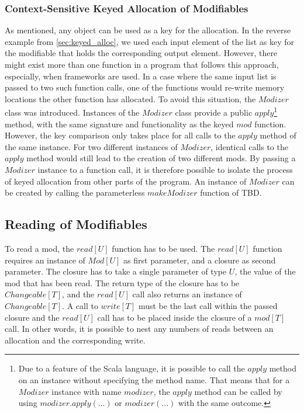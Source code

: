\subsubsection{Context-Sensitive Keyed Allocation of Modifiables}

As mentioned, any object can be used as a key for the allocation. In the reverse example from \ref{sec:keyed_alloc}, we used each input element of the list as key for the modifiable that holds the corresponding output element. However, there might exist more than one function in a program that follows this approach, especially, when frameworks are used. In a case where the same input list is passed to two such function calls, one of the functions would re-write memory locations the other function has allocated. To avoid this situation, the $Modizer$ class was introduced. Instances of the $Modizer$ class provide a public $apply$\footnote{Due to a feature of the Scala language, it is possible to call the $apply$ method on an instance without specifying the method name. That means that for a $Modizer$ instance with name $modizer$, the $apply$ method can be called by using $modizer.apply(...)$ or $modizer(...)$ with the same outcome.} method, with the same signature and functionality as the keyed $mod$ function. However, the key comparison only takes place for all calls to the $apply$ method of the same instance. For two different instances of $Modizer$, identical calls to the $apply$ method would still lead to the creation of two different mods. By passing a $Modizer$ instance to a function call, it is therefore possible to isolate the process of keyed allocation from other parts of the program. An instance of $Modizer$ can be created by calling the parameterless $makeModizer$ function of TBD. 

\subsection{Reading of Modifiables}

To read a mod, the $read[U]$ function has to be used. The $read[U]$ function requires an instance of $Mod[U]$ as first parameter, and a closure as second parameter. The closure has to take a single parameter of type $U$, the value of the mod that has been read. The return type of the closure has to be $Changeable[T]$, and the $read[U]$ call also returns an instance of $Changeable[T]$. A call to $write[T]$ must be the last call within the passed closure and the $read[U]$ call has to be placed inside the closure of a $mod[T]$ call. In other words, it is possible to nest any numbers of reads between an allocation and the corresponding write. 
 
